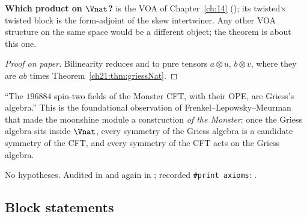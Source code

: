 \begin{dictionary}
\textbf{Which product on $\Vnat$?}   is the VOA of Chapter~\ref{ch:14}
(); its twisted$\times$twisted block is the form-adjoint of the
skew intertwiner.  Any other VOA structure on the same space would be a different object; the theorem is
about this one.
\end{dictionary}
\begin{proof}[Proof on paper]
Bilinearity reduces  and  to pure tensors
$a\otimes u$, $b\otimes v$, where they are $ab$ times Theorem~\ref{ch21:thm:griessNat}.
\end{proof}
\begin{physics}
``The $196884$ spin-two fields of the Monster CFT, with their OPE, are Griess's algebra.''  This is the
foundational observation of Frenkel--Lepowsky--Meurman that made the moonshine module a construction
\emph{of the Monster}: once the Griess algebra sits inside $\Vnat$, every symmetry of the Griess algebra
is a candidate symmetry of the CFT, and every symmetry of the CFT acts on the Griess algebra.
\end{physics}
\begin{status}
No hypotheses.  Audited in  and again in
; recorded \texttt{\#print axioms}:
.
\end{status}

\subsection{Block statements}

